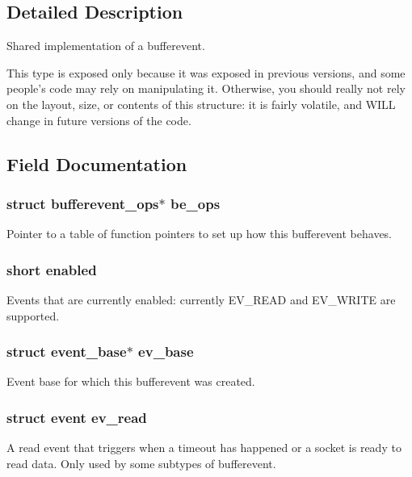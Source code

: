 \subsection{\-Detailed \-Description}
\-Shared implementation of a bufferevent.

\-This type is exposed only because it was exposed in previous versions, and some people's code may rely on manipulating it. \-Otherwise, you should really not rely on the layout, size, or contents of this structure\-: it is fairly volatile, and \-W\-I\-L\-L change in future versions of the code. 

\subsection{\-Field \-Documentation}
\subsubsection[{be\-\_\-ops}]{\setlength{\rightskip}{0pt plus 5cm}struct {\bf bufferevent\-\_\-ops}$\ast$ {\bf be\-\_\-ops}}\label{structbufferevent_a9440d1400d033e0127a4f2ced19e8499}
\-Pointer to a table of function pointers to set up how this bufferevent behaves. 
\subsubsection[{enabled}]{\setlength{\rightskip}{0pt plus 5cm}short {\bf enabled}}\label{structbufferevent_af32a952d39fc6df71dd3e6ad55a318f5}
\-Events that are currently enabled\-: currently \-E\-V\-\_\-\-R\-E\-A\-D and \-E\-V\-\_\-\-W\-R\-I\-T\-E are supported. 
\subsubsection[{ev\-\_\-base}]{\setlength{\rightskip}{0pt plus 5cm}struct {\bf event\-\_\-base}$\ast$ {\bf ev\-\_\-base}}\label{structbufferevent_a79005f93f769baaa5ab5d2a45b52ec62}
\-Event base for which this bufferevent was created. 
\subsubsection[{ev\-\_\-read}]{\setlength{\rightskip}{0pt plus 5cm}struct {\bf event} {\bf ev\-\_\-read}}\label{structbufferevent_ad0ecd4c4acef2807ba249845f21a9123}
\-A read event that triggers when a timeout has happened or a socket is ready to read data. \-Only used by some subtypes of bufferevent. 
